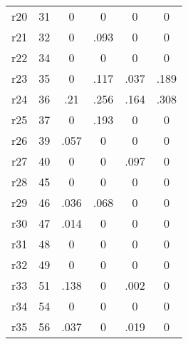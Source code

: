 \begin{table}[htbp]
\begin{tabular}{l*{5}{c}}
r20         &          31&           0&           0&           0&           0\\
r21         &          32&           0&        .093&           0&           0\\
r22         &          34&           0&           0&           0&           0\\
r23         &          35&           0&        .117&        .037&        .189\\
r24         &          36&         .21&        .256&        .164&        .308\\
r25         &          37&           0&        .193&           0&           0\\
r26         &          39&        .057&           0&           0&           0\\
r27         &          40&           0&           0&        .097&           0\\
r28         &          45&           0&           0&           0&           0\\
r29         &          46&        .036&        .068&           0&           0\\
r30         &          47&        .014&           0&           0&           0\\
r31         &          48&           0&           0&           0&           0\\
r32         &          49&           0&           0&           0&           0\\
r33         &          51&        .138&           0&        .002&           0\\
r34         &          54&           0&           0&           0&           0\\
r35         &          56&        .037&           0&        .019&           0\\
\bottomrule
\end{tabular}
\end{table}
